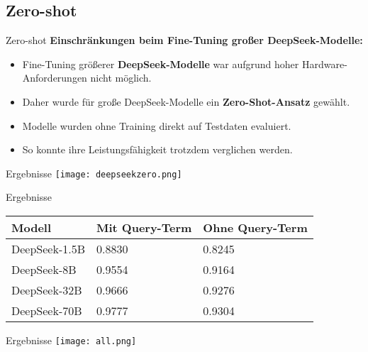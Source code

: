 \documentclass[aspectratio=169]{beamer} %
\begin{document}
\subsection{Zero-shot}
\begin{frame}{Zero-shot}
  \Large
  \textbf{Einschränkungen beim Fine-Tuning großer DeepSeek-Modelle:}

  \vspace{0.5cm}

  \begin{itemize}
      \item Fine-Tuning größerer \textbf{DeepSeek-Modelle} war aufgrund hoher Hardware-Anforderungen nicht möglich.
      \item Daher wurde für große DeepSeek-Modelle ein \textbf{Zero-Shot-Ansatz} gewählt.
      \item Modelle wurden ohne Training direkt auf Testdaten evaluiert.
      \item So konnte ihre Leistungsfähigkeit trotzdem verglichen werden.
  \end{itemize}

\end{frame}

\begin{frame}{Ergebnisse}
    \centering
    \texttt{[image: deepseekzero.png]}
\end{frame}

\begin{frame}{Ergebnisse}
    \centering
    \scriptsize
    \begin{tabular}{|l|l|l|}
        \hline
        \textbf{Modell} & \textbf{Mit Query-Term} & \textbf{Ohne Query-Term} \\
        \hline
        DeepSeek-1.5B & 0.8830 & 0.8245 \\
        DeepSeek-8B   & 0.9554 & 0.9164 \\
        DeepSeek-32B  & 0.9666 & 0.9276 \\
        DeepSeek-70B  & 0.9777 & 0.9304 \\
        \hline
    \end{tabular}
\end{frame}

\begin{frame}{Ergebnisse}
    \centering
    \texttt{[image: all.png]}
\end{frame}

\end{document}
